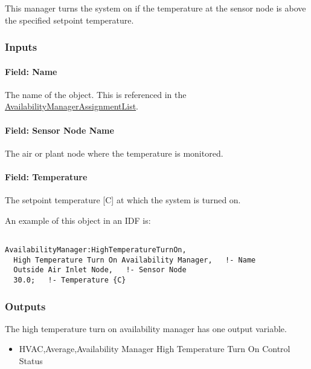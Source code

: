 This manager turns the system on if the temperature at the sensor node is above the specified setpoint temperature.

\subsubsection{Inputs}\label{inputs-6-028}

\paragraph{Field: Name}\label{field-name-5-025}

The name of the object. This is referenced in the \hyperref[availabilitymanagerassignmentlist]{AvailabilityManagerAssignmentList}.

\paragraph{Field: Sensor Node Name}\label{field-sensor-node-name-1-000}

The air or plant node where the temperature is monitored.

\paragraph{Field: Temperature}\label{field-temperature-1}

The setpoint temperature {[}C{]} at which the system is turned on.

An example of this object in an IDF is:

\begin{lstlisting}

AvailabilityManager:HighTemperatureTurnOn,
  High Temperature Turn On Availability Manager,   !- Name
  Outside Air Inlet Node,   !- Sensor Node
  30.0;   !- Temperature {C}
\end{lstlisting}

\subsubsection{Outputs}\label{outputs-5-010}

The high temperature turn on availability manager has one output variable.

\begin{itemize}
\tightlist
\item
  HVAC,Average,Availability Manager High Temperature Turn On Control Status
\end{itemize}

